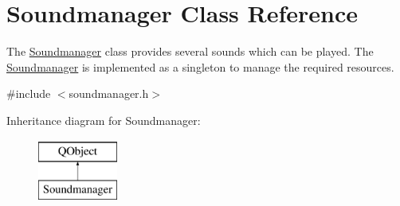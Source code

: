 \hypertarget{class_soundmanager}{\section{Soundmanager Class Reference}
\label{class_soundmanager}
}


The \hyperlink{class_soundmanager}{Soundmanager} class provides several sounds which can be played.  The \hyperlink{class_soundmanager}{Soundmanager} is implemented as a singleton to manage the required resources.  




{\ttfamily \#include $<$soundmanager.\+h$>$}

Inheritance diagram for Soundmanager\+:\begin{figure}[H]
\begin{center}
\leavevmode
\includegraphics[height=2.000000cm]{class_soundmanager}
\end{center}
\end{figure}
